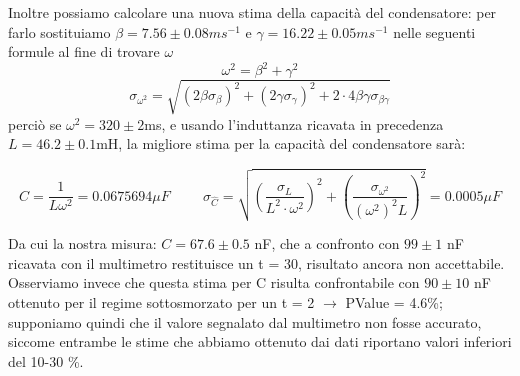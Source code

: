 \documentclass[a4paper]{article}
\theoremstyle{definition}
\begin{document}
\noindent Inoltre possiamo calcolare una nuova stima della capacità del condensatore: per farlo
sostituiamo \(\beta = 7.56 \pm  0.08 ms^{-1}\) e \(\gamma = 16.22 \pm  0.05 ms^{-1}\) nelle seguenti formule al fine di trovare $\omega$ 
\[\omega^{2} =\beta ^{2} + \gamma^{2}\]
\[ \sigma_{\omega^{2}} = \sqrt{  (2\beta\sigma_{\beta})^{2} + (2\gamma\sigma_{\gamma})^{2} + 2 \cdot 4 \beta \gamma \sigma_{\beta\gamma}   }\]
perciò se \( \omega^{2}= 320 \pm 2 \)ms, e usando l'induttanza ricavata in precedenza \(L = 46.2 \pm 0.1\)mH, la migliore stima per la capacità del condensatore sarà:

\[\hat{C} = \frac{1}{L\omega^{2}} = 0.0675694  \mu F \hspace{1cm}
\sigma_{\hat{C}} = \sqrt{ \left( \frac{\sigma_{L}}{L^{2}\cdot \omega^{2}} \right)^{2} +\left(\frac{\sigma_{\omega^{2}}}{(\omega^{2})^{2}L}\right)^{2}  } =   0.0005 \mu F\]

\noindent Da cui la nostra misura: \(C = 67.6 \pm 0.5 \) nF, che a confronto con \( 99 \pm 1 \) nF ricavata con il multimetro restituisce un t = 30, risultato ancora non accettabile. Osserviamo invece che questa stima per C risulta confrontabile con \(90 \pm 10\) nF ottenuto per il regime sottosmorzato per un t = 2 \(\rightarrow\) PValue = 4.6\%; supponiamo quindi che il valore segnalato dal multimetro non fosse accurato, siccome entrambe le stime che abbiamo ottenuto dai dati riportano valori inferiori del 10-30 \%.
\end{document}
